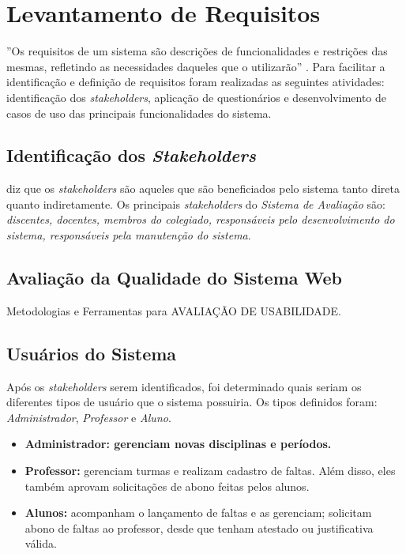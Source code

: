 \documentclass[
  12pt,       %
  openright,      %
  oneside,      %
  a4paper,      %
  english,      %
  french,        %
  spanish,     %
  brazil        %
  ]{abntex2-decsi}
\begin{document}
    \section{Levantamento de Requisitos}

    ''Os requisitos de um sistema são descrições de funcionalidades e restrições das mesmas, refletindo as necessidades daqueles que o utilizarão'' \cite[p. 83, tradução nossa]{sommervile:2011}. Para facilitar a identificação e definição de requisitos foram realizadas as seguintes atividades: identificação dos \textit{stakeholders}, aplicação de questionários e desenvolvimento de casos de uso das principais funcionalidades do sistema.

    \subsection{Identificação dos \textit{Stakeholders}}

     diz que os \textit{stakeholders} são aqueles que são beneficiados pelo sistema tanto direta quanto indiretamente. Os principais \textit{stakeholders} do \textit{Sistema de Avaliação} são: \textit{discentes, docentes, membros do colegiado, responsáveis pelo desenvolvimento do sistema, responsáveis pela manutenção do sistema}.   
    
    
	\subsection{Avaliação da Qualidade do Sistema Web}
     Metodologias e Ferramentas para 
     AVALIAÇÃO DE USABILIDADE.

    \subsection{Usuários do Sistema}

    Após os \textit{stakeholders} serem identificados, foi determinado quais seriam os diferentes tipos de usuário que o sistema possuiria. Os tipos definidos foram: \textit{Administrador}, \textit{Professor} e \textit{Aluno}.

    \begin{itemize}
   		\item \textbf{Administrador: gerenciam novas disciplinas e períodos.} 
        \item \textbf{Professor: } gerenciam turmas e realizam cadastro de faltas. Além disso, eles também aprovam solicitações de abono feitas pelos alunos.
        \item \textbf{Alunos: } acompanham o lançamento de faltas e as gerenciam; solicitam abono de faltas ao professor, desde que tenham atestado ou justificativa válida.
    \end{itemize}   
    
\end{document}
